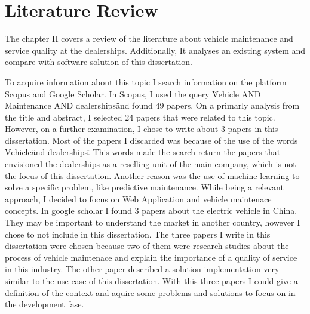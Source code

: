 \chapter{Literature Review}%
\label{chapter:literatureReview}

\begin{introduction}
The chapter II covers a review of the literature about vehicle maintenance and service quality at the dealerships. 
Additionally, It analyses an existing system and compare with software solution of this dissertation.
\end{introduction} 


To acquire information about this topic I search information on the platform Scopus and Google Scholar. 
In Scopus, I used the query \"Vehicle AND Maintenance AND dealerships\" and found 49 papers.
On a primarly analysis from the title and abstract, I selected 24 papers that were related to this topic.
However, on a further examination, I chose to write about 3 papers in this dissertation. 
Most of the papers I discarded was because of the use of the words \"Vehicle\" and \"dealerships\". 
This words made the search return the papers that envisioned the dealerships as a reselling unit of the main company, which is not the focus of this dissertation.
Another reason was the use of machine learning to solve a specific problem, like predictive maintenance. 
While being a relevant approach, I decided to focus on Web Application and vehicle maintenace concepts.
In google scholar I found 3 papers about the electric vehicle in China. 
They may be important to understand the market in another country, however I chose to not include in this dissertation.  
The three papers I write in this dissertation were chosen because two of them were research studies about the process of vehicle maintenace and explain the importance of a quality of service in this industry.
The other paper described a solution implementation very similar to the use case of this dissertation.
With this three papers I could give a definition of the context and aquire some problems and solutions to focus on in the development fase.  






